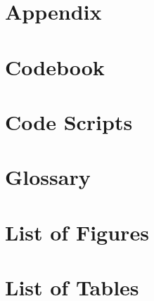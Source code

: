\documentclass[hidelinks, 12pt]{article}
\begin{document}

%
\tableofcontents
\newpage



\newpage
\printbibliography


\newpage
{} 
\appendix
{}
\section*{Appendix}
\label{appendix} %
\thispagestyle{empty}

\newpage


\newpage
\section{Codebook}
\label{appendix:codebook}


\newpage
\section{Code Scripts}
\label{appendix:code-scripts}


\newpage
\section{Glossary}
\label{appendix:glossary}


\newpage
\section{List of Figures}
\listoffigures

\newpage
\section{List of Tables}
\listoftables
\end{document}
